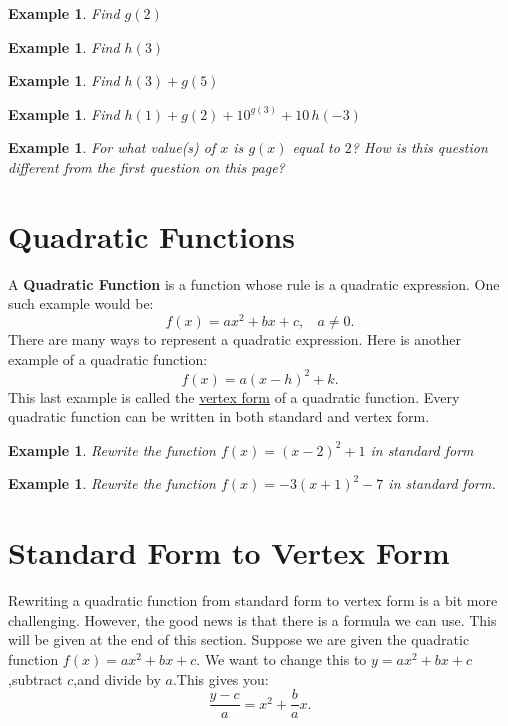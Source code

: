 \documentclass[twoside]{tufte-handout}
\newcommand{\booksection}{0}
\newcommand{\pageheader}{}
\newcounter{ekcounter}%
\theoremstyle{ekimcustom}
\newtheorem{exm}[ekcounter]{Example}
\begin{document}
\begin{exm}
Find $g(2)$
\end{exm}
\vskip10pt
\begin{exm}
Find $h(3)$
\end{exm}
\vskip10pt
\begin{exm}
Find $h(3)+g(5)$
\end{exm}
\vskip10pt
\begin{exm}
Find $h(1)+g(2) + 10^{g(3)} + 10\,h(-3)$
\end{exm}
\vskip10pt
\begin{exm}
For what value(s) of $x$ is $g(x)$ equal to $2$? How is this question different from the first question on this page?
\end{exm}
\vskip10pt

\renewcommand{\booksection}{Quadratic Functions}
\renewcommand{\pageheader}{\booksection }
\section*{\LARGE \pageheader}

 A {\bf Quadratic Function} is a function whose rule is a quadratic expression. One such example would be:  $$f(x)=ax^2+bx+c, ~~~~ a\neq 0.$$
There are many ways to represent a quadratic expression. Here is another example of a quadratic function: 
		$$f(x)=a(x-h)^2+k.$$
  This last example is called the \underline{vertex form} of a quadratic function.  Every quadratic function can be written in both standard and vertex form. 	



\everymath{\displaystyle}
\begin{exm}{}Rewrite the function $f(x)=(x-2)^2+1$ in standard form
\end{exm}\vskip10pt

\begin{exm}{}Rewrite the function $f(x)=-3(x+1)^2-7$ in standard form.
\end{exm}\vskip10pt




\section{Standard Form to Vertex Form}
Rewriting a quadratic function from standard form to vertex form is a bit more challenging. However, the good news is that there is a formula we can use. This will be given at the end of this section. 
 Suppose we are given the quadratic function $f(x)=ax^2+bx+c$. We want to change this to $y=ax^2+bx+c$,subtract $c$,and divide by $a$.This gives you: 
		$$\frac{y-c}{a}=x^2+\frac{b}{a}x.$$ 
  
\end{document}

